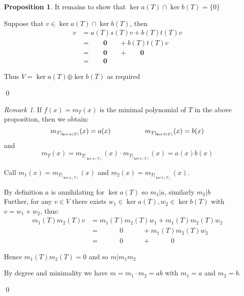 \documentclass[11pt, a4paper]{report}
\makeatletter
\numberwithin{equation}{section}
\newcommand{\opl}{\boldsymbol{\oplus}}
\numberwithin{equation}{subsection}
\theoremstyle{plain}
\theoremstyle{definition}
\newtheorem{prop}[thm]{Proposition}
\theoremstyle{remark}
\newtheorem*{rem}{Remark}
\newtheorem*{prf}{Proof}
\renewenvironment{prf}[1][\proofname]{\par
  \vspace{-\topsep}%
  \normalfont
  \topsep0pt \partopsep0pt %
  \trivlist
  \item[\hskip\labelsep
        \itshape
    #1\@addpunct{.}]\ignorespaces
}{%
  \popQED\endtrivlist\@endpefalse
  \addvspace{6pt plus 6pt} %
}
\newcommand{\pr}[1]{\begin{adjustwidth}{1cm}{} \begin{prf} #1 \end{prf} \end{adjustwidth}}
\makeatother
\begin{document}
\begin{prop}
{It remains to show that $\ker a(T) \cap \ker b(T) = \{ 0 \}$

Suppose that $v \in \ker a(T) \cap \ker b(T)$, then
\begin{align*}
v 	&= a(T)s(T)v + b(T)t(T)v \tag{by $*$}\\
	&= \hspace{22pt} \boldsymbol{0} \hspace{21pt} + b(T)t(T)v \tag{$v \in \ker a(T)$}\\
	&= \hspace{22pt} \boldsymbol{0} \hspace{21pt} + \hspace{22pt} \boldsymbol{0} \tag{$v \in \ker b(T)$}\\
	&= \hspace{22pt} \boldsymbol{0}
\end{align*}

Thus $V = \ker a(T) \opl \ker b(T)$ as required

}\qed
\end{prop}

\begin{rem}
If $f(x) = m_T(x)$ is the minimal polynomial of $T$ in the above proposition, then we obtain:
$$m_{T|_{\ker a(T)}}(x) = a(x) \hspace*{50pt} m_{T|_{\ker b(T)}}(x) = b(x)$$
\hspace{38pt} and
$$m_T(x) = m_{T|_{\ker a(T)}}(x) \cdot m_{T|_{\ker b(T)}}(x) = a(x)b(x)$$

\pr{
Call $m_1(x) = m_{T|_{\ker a(T)}}(x)$ and $m_2(x) = m_{T|_{\ker b(T)}}(x)$.

By definition $a$ is annihilating for $\ker a(T)$ so $m_1 | a$, similarly $m_2 | b$\\
Further, for any $v \in V$ there exists $w_1 \in \ker a(T), w_2 \in \ker b(T)$ with $v = w_1 + w_2$, thus:
\begin{align*}
m_1(T)m_2(T) v	&= m_1(T)m_2(T) w_1 + m_1(T)m_2(T) w_2\\
				&= \hspace{35pt} 0 \hspace{34pt} + m_1(T)m_2(T) w_2 \tag{$m_1(T)$ annihilates $\ker a(T)$}\\
				&= \hspace{35pt} 0 \hspace{34pt} + \hspace{35pt} 0 \hspace{34pt} \tag{$m_2(T)$ annihilates $\ker b(T)$}
\end{align*}

Hence $m_1(T)m_2(T) = 0$ and so $m|m_1m_2$

By degree and minimality we have $m = m_1 \cdot m_2 = ab$ with $m_1 = a$ and $m_2 = b$.
}\qed
\end{rem}
\end{document}
